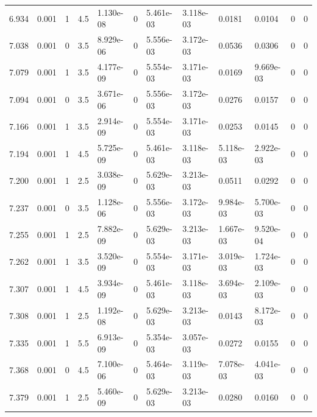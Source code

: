 \documentclass[preview]{standalone}
\begin{document}
{{{\begin{tabular}{L{1.2cm}C{1.2cm} C{0.3cm}C{0.5cm} C{1.4cm}C{1.4cm} C{1.4cm}C{1.4cm} C{1.6cm}C{1.6cm} C{1.6cm}C{1.6cm}}
  6.934  &  0.001  & 1     & 4.5 &  1.130e-08  & 0  &  5.461e-03&   3.118e-03& 0.0181 & 0.0104   &  0 & 0  \\ 
  7.038  &  0.001  & 0     & 3.5 &  8.929e-06  & 0  &  5.556e-03&   3.172e-03& 0.0536 & 0.0306   &  0 & 0  \\ 
  7.079  &  0.001  & 1     & 3.5 &  4.177e-09  & 0  &  5.554e-03&   3.171e-03& 0.0169 & 9.669e-03   &  0 & 0  \\ 
  7.094  &  0.001  & 0     & 3.5 &  3.671e-06  & 0  &  5.556e-03&   3.172e-03& 0.0276 & 0.0157   &  0 & 0  \\ 
  7.166  &  0.001  & 1     & 3.5 &  2.914e-09  & 0  &  5.554e-03&   3.171e-03& 0.0253 & 0.0145   &  0 & 0  \\ 
  7.194  &  0.001  & 1     & 4.5 &  5.725e-09  & 0  &  5.461e-03&   3.118e-03& 5.118e-03 & 2.922e-03   &  0 & 0  \\ 
  7.200  &  0.001  & 1     & 2.5 &  3.038e-09  & 0  &  5.629e-03&   3.213e-03& 0.0511 & 0.0292   &  0 & 0  \\ 
  7.237  &  0.001  & 0     & 3.5 &  1.128e-06  & 0  &  5.556e-03&   3.172e-03& 9.984e-03 & 5.700e-03   &  0 & 0  \\ 
  7.255  &  0.001  & 1     & 2.5 &  7.882e-09  & 0  &  5.629e-03&   3.213e-03& 1.667e-03 & 9.520e-04   &  0 & 0  \\ 
  7.262  &  0.001  & 1     & 3.5 &  3.520e-09  & 0  &  5.554e-03&   3.171e-03& 3.019e-03 & 1.724e-03   &  0 & 0  \\ 
  7.307  &  0.001  & 1     & 4.5 &  3.934e-09  & 0  &  5.461e-03&   3.118e-03& 3.694e-03 & 2.109e-03   &  0 & 0  \\ 
  7.308  &  0.001  & 1     & 2.5 &  1.192e-08  & 0  &  5.629e-03&   3.213e-03& 0.0143 & 8.172e-03   &  0 & 0  \\ 
  7.335  &  0.001  & 1     & 5.5 &  6.913e-09  & 0  &  5.354e-03&   3.057e-03& 0.0272 & 0.0155   &  0 & 0  \\ 
  7.368  &  0.001  & 0     & 4.5 &  7.100e-06  & 0  &  5.464e-03&   3.119e-03& 7.078e-03 & 4.041e-03   &  0 & 0  \\ 
  7.379  &  0.001  & 1     & 2.5 &  5.460e-09  & 0  &  5.629e-03&   3.213e-03& 0.0280 & 0.0160   &  0 & 0  \\ 
\hline 
\end{tabular} 

}}}
\end{document}
